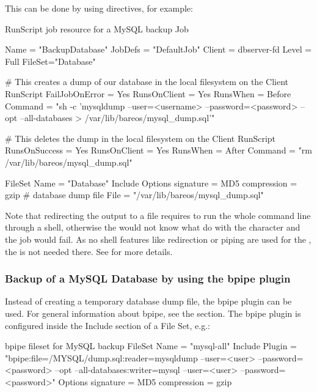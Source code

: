 This can be done by using  directives, for example:
\begin{bconfig}{RunScript job resource for a MySQL backup}
Job {
  Name = "BackupDatabase"
  JobDefs = "DefaultJob"
  Client = dbserver-fd
  Level = Full
  FileSet="Database"

  # This creates a dump of our database in the local filesystem on the Client
  RunScript {
    FailJobOnError = Yes
    RunsOnClient = Yes
    RunsWhen = Before
    Command = "sh -c 'mysqldump --user=<username> --password=<password> --opt --all-databases > /var/lib/bareos/mysql_dump.sql'"
  }

  # This deletes the dump in the local filesystem on the Client
  RunScript {
    RunsOnSuccess = Yes
    RunsOnClient = Yes
    RunsWhen = After
    Command = "rm /var/lib/bareos/mysql_dump.sql"
  }
}

FileSet {
  Name = "Database"
  Include {
    Options {
      signature = MD5
      compression = gzip
    }
  # database dump file
  File = "/var/lib/bareos/mysql_dump.sql" 
  }
}
\end{bconfig}

Note that redirecting the  output to a file requires
to run the whole command line through a shell, otherwise the 
would not know what do with the \command{>} character and the job would fail.
As no shell features like redirection or piping are used for the ,
the  is not needed there.
See  for more details.


\subsubsection{Backup of a MySQL Database by using the bpipe plugin}

Instead of creating a temporary database dump file,
the bpipe plugin can be used. 
For general information about bpipe, see the  section. 
The bpipe plugin is configured inside the Include section of a File Set, e.g.:
\begin{bconfig}{bpipe fileset for MySQL backup}
FileSet {
  Name = "mysql-all"
  Include {
    Plugin = "bpipe:file=/MYSQL/dump.sql:reader=mysqldump --user=<user> --password=<password> --opt --all-databases:writer=mysql --user=<user> --password=<password>"
    Options {
      signature = MD5
      compression = gzip
    }
  }
}
\end{bconfig}

